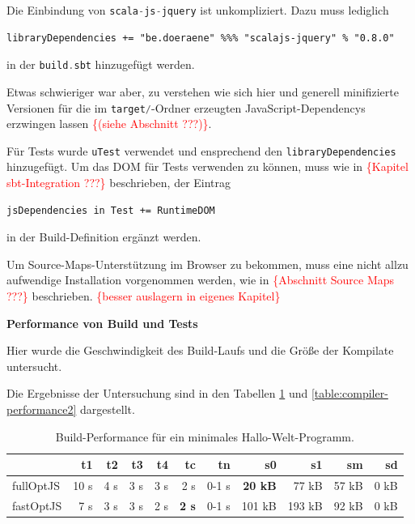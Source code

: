 \documentclass[a4paper, 12pt, hidelinks, listof=totoc, listoftables=totoc, bibliography=totoc]{scrreprt}
\newcommand{\code}[1]{\lstinline[language=Scala, style=inline]|#1|}
\newcommand{\TODOi}[1]{\textcolor{red}{\{#1\}}}
\newcommand{\MyMiniSec}[1]{\rmfamily\fontsize{12}{15}\selectfont
	\vspace{7pt}\textbf{#1} %
}
\begin{document}
Die Einbindung von \code{scala-js-jquery} ist unkompliziert. Dazu muss lediglich
\begin{lstlisting}[style=snippet]
libraryDependencies += "be.doeraene" %%% "scalajs-jquery" % "0.8.0"
\end{lstlisting}
in der \code{build.sbt} hinzugefügt werden.

Etwas schwieriger war aber, zu verstehen wie sich hier und generell minifizierte Versionen für die im \code{target/}-Ordner erzeugten JavaScript-Dependencys erzwingen lassen \TODOi{(siehe Abschnitt ???)}.

Für Tests wurde \code{uTest} verwendet und ensprechend den \code{libraryDependencies} hinzugefügt. Um das \ac{DOM} für Tests verwenden zu können, muss wie in \TODOi{Kapitel sbt-Integration ???} beschrieben, der Eintrag
\begin{lstlisting}[style=snippet]
jsDependencies in Test += RuntimeDOM
\end{lstlisting}
in der Build-Definition ergänzt werden.

Um Source-Maps-Unterstützung im Browser zu bekommen, muss eine nicht allzu aufwendige Installation vorgenommen werden, wie in \TODOi{Abschnitt Source Maps ???} beschrieben. \TODOi{besser auslagern in eigenes Kapitel}

\MyMiniSec{Performance von Build und Tests}

Hier wurde die Geschwindigkeit des Build-Laufs und die Größe der Kompilate untersucht.

Die Ergebnisse der Untersuchung sind in den Tabellen \ref{table:compiler-performance1} und \ref{table:compiler-performance2} dargestellt.

\medskip

\begin{table}[!h]
\begin{tabular}{|l|r|r|r|r|r|r||r|r|r|r|}
\hline           & t1   & t2   & t3   & t4   & tc            & tn    & s0             & s1     & sm    & sd    \\ 
\hline fullOptJS & 10 s &  4 s &  3 s &  3 s &          2 s  & 0-1 s & \textbf{20 kB} &  77 kB & 57 kB &  0 kB \\ 
\hline fastOptJS &  7 s &  3 s &  3 s &  2 s &  \textbf{2 s} & 0-1 s &        101 kB  & 193 kB & 92 kB &  0 kB \\ 
\hline 
\end{tabular} 
\caption{Build-Performance für ein minimales Hallo-Welt-Programm.}
\label{table:compiler-performance1}
\end{table}
\end{document}
